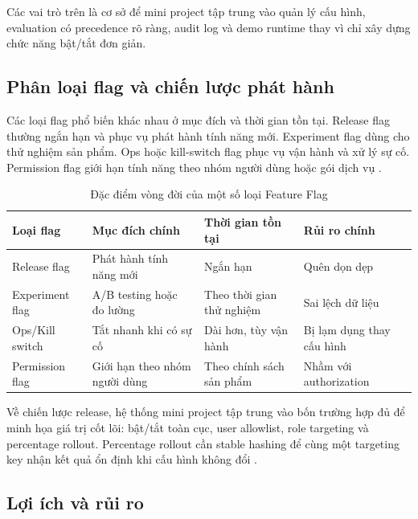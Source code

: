 Các vai trò trên là cơ sở để mini project tập trung vào quản lý cấu hình, evaluation có precedence rõ ràng, audit log và demo runtime thay vì chỉ xây dựng chức năng bật/tắt đơn giản.

\subsection{Phân loại flag và chiến lược phát hành}

Các loại flag phổ biến khác nhau ở mục đích và thời gian tồn tại. Release flag thường ngắn hạn và phục vụ phát hành tính năng mới. Experiment flag dùng cho thử nghiệm sản phẩm. Ops hoặc kill-switch flag phục vụ vận hành và xử lý sự cố. Permission flag giới hạn tính năng theo nhóm người dùng hoặc gói dịch vụ \cite{fowler_feature_toggles,unleash_feature_flag_best_practices}.

\begin{table}[H]
    \centering
    \caption{Đặc điểm vòng đời của một số loại Feature Flag}
    \label{tab:feature-flag-lifecycle}
    \begin{tabular}{p{} p{} p{} p{}}
        \toprule
        \textbf{Loại flag} & \textbf{Mục đích chính} & \textbf{Thời gian tồn tại} & \textbf{Rủi ro chính} \\
        \midrule
        Release flag & Phát hành tính năng mới & Ngắn hạn & Quên dọn dẹp \\
        Experiment flag & A/B testing hoặc đo lường & Theo thời gian thử nghiệm & Sai lệch dữ liệu \\
        Ops/Kill switch & Tắt nhanh khi có sự cố & Dài hơn, tùy vận hành & Bị lạm dụng thay cấu hình \\
        Permission flag & Giới hạn theo nhóm người dùng & Theo chính sách sản phẩm & Nhầm với authorization \\
        \bottomrule
    \end{tabular}
\end{table}

Về chiến lược release, hệ thống mini project tập trung vào bốn trường hợp đủ để minh họa giá trị cốt lõi: bật/tắt toàn cục, user allowlist, role targeting và percentage rollout. Percentage rollout cần stable hashing để cùng một targeting key nhận kết quả ổn định khi cấu hình không đổi \cite{launchdarkly_targeting_rules,launchdarkly_percentage_rollouts}.

\subsection{Lợi ích và rủi ro}

